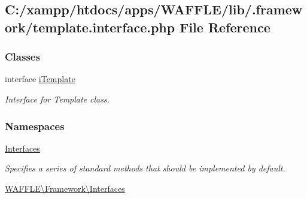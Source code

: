 \hypertarget{template_8interface_8php}{}\subsection{C\+:/xampp/htdocs/apps/\+W\+A\+F\+F\+L\+E/lib/.framework/template.interface.\+php File Reference}
\label{template_8interface_8php}
\subsubsection*{Classes}
\begin{DoxyCompactItemize}
\item 
interface \hyperlink{interface_w_a_f_f_l_e_1_1_framework_1_1_interfaces_1_1i_template}{i\+Template}
\begin{DoxyCompactList}\small\item\em Interface for Template class. \end{DoxyCompactList}\end{DoxyCompactItemize}
\subsubsection*{Namespaces}
\begin{DoxyCompactItemize}
\item 
 \hyperlink{namespace_interfaces}{Interfaces}
\begin{DoxyCompactList}\small\item\em Specifies a series of standard methods that should be implemented by default. \end{DoxyCompactList}\item 
 \hyperlink{namespace_w_a_f_f_l_e_1_1_framework_1_1_interfaces}{W\+A\+F\+F\+L\+E\textbackslash{}\+Framework\textbackslash{}\+Interfaces}
\end{DoxyCompactItemize}
